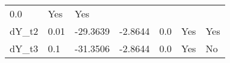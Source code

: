 \documentclass{article}
\begin{document}
\begin{longtable}[c]{@{}lllllll@{}}
\begin{minipage}[t]{0.12\columnwidth}
0.0
\strut\end{minipage} &
\begin{minipage}[t]{0.15\columnwidth}\raggedright\strut
Yes
\strut\end{minipage} &
\begin{minipage}[t]{0.10\columnwidth}\raggedright\strut
Yes
\strut\end{minipage}\tabularnewline
\begin{minipage}[t]{0.11\columnwidth}\raggedright\strut
dY\_t2
\strut\end{minipage} &
\begin{minipage}[t]{0.09\columnwidth}\raggedright\strut
0.01
\strut\end{minipage} &
\begin{minipage}[t]{0.15\columnwidth}\raggedright\strut
-29.3639
\strut\end{minipage} &
\begin{minipage}[t]{0.18\columnwidth}\raggedright\strut
-2.8644
\strut\end{minipage} &
\begin{minipage}[t]{0.12\columnwidth}\raggedright\strut
0.0
\strut\end{minipage} &
\begin{minipage}[t]{0.15\columnwidth}\raggedright\strut
Yes
\strut\end{minipage} &
\begin{minipage}[t]{0.10\columnwidth}\raggedright\strut
Yes
\strut\end{minipage}\tabularnewline
\begin{minipage}[t]{0.11\columnwidth}\raggedright\strut
dY\_t3
\strut\end{minipage} &
\begin{minipage}[t]{0.09\columnwidth}\raggedright\strut
0.1
\strut\end{minipage} &
\begin{minipage}[t]{0.15\columnwidth}\raggedright\strut
-31.3506
\strut\end{minipage} &
\begin{minipage}[t]{0.18\columnwidth}\raggedright\strut
-2.8644
\strut\end{minipage} &
\begin{minipage}[t]{0.12\columnwidth}\raggedright\strut
0.0
\strut\end{minipage} &
\begin{minipage}[t]{0.15\columnwidth}\raggedright\strut
Yes
\strut\end{minipage} &
\begin{minipage}[t]{0.10\columnwidth}\raggedright\strut
No
\strut\end{minipage}\tabularnewline
\bottomrule
\end{longtable}
\end{document}
